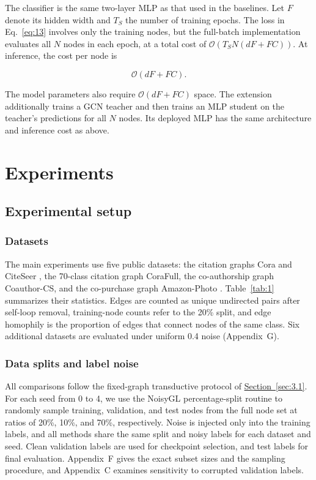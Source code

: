\documentclass[a4paper,fleqn]{cas-sc}
\theoremstyle{definition}
\theoremstyle{plain}
\begin{document}
The classifier is the same two-layer MLP as that used in the baselines. Let \(F\) denote its hidden width and \(T_{S}\) the number of training epochs. The loss in Eq.~\eqref{eq:13} involves only the training nodes, but the full-batch implementation evaluates all \(N\) nodes in each epoch, at a total cost of \(\mathcal{O}(T_{S}N(dF + FC))\). At inference, the cost per node is

\begin{equation}\label{eq:23}
\mathcal{O}(dF + FC).
\end{equation}

The model parameters also require \(\mathcal{O}(dF + FC)\) space. The extension additionally trains a GCN teacher and then trains an MLP student on the teacher's predictions for all \(N\) nodes. Its deployed MLP has the same architecture and inference cost as above.
\section{Experiments}\label{sec:4}

\subsection{Experimental setup}\label{sec:4.1}

\subsubsection{Datasets}\label{sec:4.1.1}

The main experiments use five public datasets: the citation graphs Cora and CiteSeer \cite{ref69}, the 70-class citation graph CoraFull, the co-authorship graph Coauthor-CS, and the co-purchase graph Amazon-Photo \cite{ref70}. Table~\ref{tab:1} summarizes their statistics. Edges are counted as unique undirected pairs after self-loop removal, training-node counts refer to the 20\% split, and edge homophily is the proportion of edges that connect nodes of the same class. Six additional datasets are evaluated under uniform 0.4 noise (Appendix~G).



\subsubsection{Data splits and label noise}\label{sec:4.1.2}

All comparisons follow the fixed-graph transductive protocol of \hyperref[sec:3.1]{Section~\ref*{sec:3.1}}. For each seed from 0 to 4, we use the NoisyGL percentage-split routine to randomly sample training, validation, and test nodes from the full node set at ratios of 20\%, 10\%, and 70\%, respectively. Noise is injected only into the training labels, and all methods share the same split and noisy labels for each dataset and seed. Clean validation labels are used for checkpoint selection, and test labels for final evaluation. Appendix~F gives the exact subset sizes and the sampling procedure, and Appendix~C examines sensitivity to corrupted validation labels.
\end{document}

